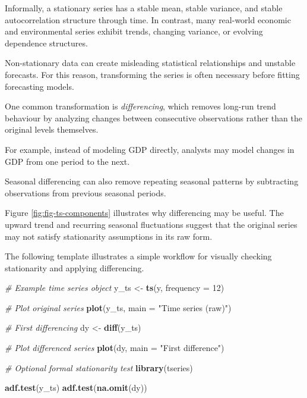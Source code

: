 \documentclass[
  11pt,
  oneside]{book}
\newenvironment{Shaded}{\begin{snugshade}}{\end{snugshade}}
\newcommand{\AttributeTok}[1]{\textcolor[rgb]{0.13,0.29,0.53}{#1}}
\newcommand{\CommentTok}[1]{\textcolor[rgb]{0.56,0.35,0.01}{\textit{#1}}}
\newcommand{\DecValTok}[1]{\textcolor[rgb]{0.00,0.00,0.81}{#1}}
\newcommand{\FunctionTok}[1]{\textcolor[rgb]{0.13,0.29,0.53}{\textbf{#1}}}
\newcommand{\NormalTok}[1]{#1}
\newcommand{\OtherTok}[1]{\textcolor[rgb]{0.56,0.35,0.01}{#1}}
\newcommand{\StringTok}[1]{\textcolor[rgb]{0.31,0.60,0.02}{#1}}
\begin{document}
Informally, a stationary series has a stable mean, stable variance, and stable autocorrelation structure through time. In contrast, many real-world economic and environmental series exhibit trends, changing variance, or evolving dependence structures.

Non-stationary data can create misleading statistical relationships and unstable forecasts. For this reason, transforming the series is often necessary before fitting forecasting models.

One common transformation is \emph{differencing}, which removes long-run trend behaviour by analyzing changes between consecutive observations rather than the original levels themselves.

For example, instead of modeling GDP directly, analysts may model changes in GDP from one period to the next.

Seasonal differencing can also remove repeating seasonal patterns by subtracting observations from previous seasonal periods.

Figure \ref{fig:fig-ts-components} illustrates why differencing may be useful. The upward trend and recurring seasonal fluctuations suggest that the original series may not satisfy stationarity assumptions in its raw form.

The following template illustrates a simple workflow for visually checking stationarity and applying differencing.

\begin{Shaded}
\begin{Highlighting}[]
\CommentTok{\# Example time series object}
\NormalTok{y\_ts }\OtherTok{\textless{}{-}} \FunctionTok{ts}\NormalTok{(y, }\AttributeTok{frequency =} \DecValTok{12}\NormalTok{)}

\CommentTok{\# Plot original series}
\FunctionTok{plot}\NormalTok{(y\_ts, }\AttributeTok{main =} \StringTok{"Time series (raw)"}\NormalTok{)}

\CommentTok{\# First differencing}
\NormalTok{dy }\OtherTok{\textless{}{-}} \FunctionTok{diff}\NormalTok{(y\_ts)}

\CommentTok{\# Plot differenced series}
\FunctionTok{plot}\NormalTok{(dy, }\AttributeTok{main =} \StringTok{"First difference"}\NormalTok{)}

\CommentTok{\# Optional formal stationarity test}
\FunctionTok{library}\NormalTok{(tseries)}

\FunctionTok{adf.test}\NormalTok{(y\_ts)}
\FunctionTok{adf.test}\NormalTok{(}\FunctionTok{na.omit}\NormalTok{(dy))}
\end{Highlighting}
\end{Shaded}
\end{document}
